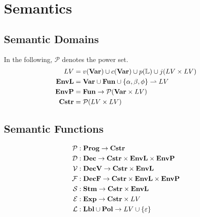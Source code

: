 
\newcommand{\iP}{\mathcal{P}}
\newcommand{\iD}{\mathcal{D}}
\newcommand{\iV}{\mathcal{V}}
\newcommand{\iF}{\mathcal{F}}
\newcommand{\iS}{\mathcal{S}}
\newcommand{\iE}{\mathcal{E}}
\newcommand{\iL}{\mathcal{L}}
\newcommand{\iO}{\mathcal{O}}

\newcommand{\iLV}{LV}

\newcommand{\dblSq}[1]{[\![ #1 ]\!]}

\newcommand{\rspace}{\\[0.5em]}
\newcommand{\dsWhere}[1]{\quad \text{ where } #1}
\newcommand{\dsAnd}[1]{\quad \text{ and } #1}

\section{Semantics}

\subsection{Semantic Domains}
In the following, $\mathcal P$ denotes the power set.
\begin{align*}
\iLV      & = v(\iVar) \cup c(\iVar) \cup p(\mathbb{L}) \cup j(\iLV \times \iLV) \\
\iEnvL  & = \iVar \cup \iFun \cup \{ \ia, \ib, \ifb \} \rightharpoonup \iLV \\
\iEnvP  & = \iFun \rightarrow \mathcal{P}(\iVar \times \iLV) \\
\iCstr  & = \mathcal P (\iLV \times \iLV)
\end{align*}

\subsection{Semantic Functions}
\begin{align*}
\iP & : \iProg \rightarrow \iCstr \\
\iD & : \iDec \rightarrow \iCstr \times \iEnvL \times \iEnvP \\
\iV & : \iDecv \rightarrow \iCstr \times \iEnvL \\
\iF & : \iDecf \rightarrow \iCstr \times \iEnvL \times \iEnvP \\
\iS & : \iStm \rightarrow \iCstr \times \iEnvL \\
\iE & : \iExp \rightarrow \iCstr \times \iLV \\
\iL & : \iLbl \cup \iPol \rightarrow \iLV \cup \{ \varepsilon \}
\end{align*}

